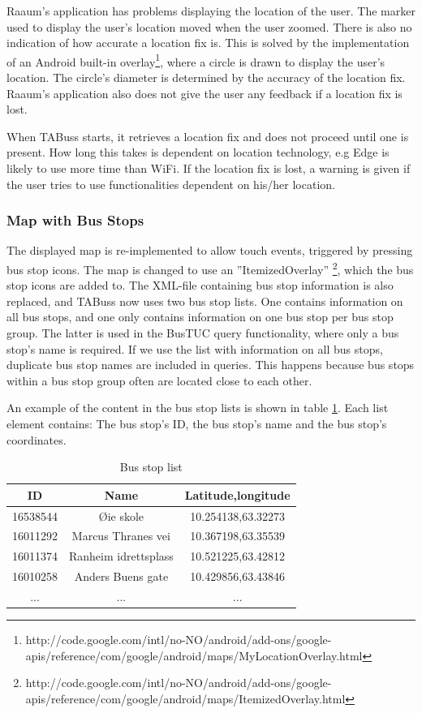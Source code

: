 Raaum's application has problems displaying the location of the user. The marker used to display the user's location moved when the user zoomed. There is also no indication of how accurate a location fix is. This is solved by the implementation of an Android built-in overlay\footnote{http://code.google.com/intl/no-NO/android/add-ons/google-apis/reference/com/google/android/maps/MyLocationOverlay.html}, where a circle is drawn to display the user's location. The circle's diameter is determined by the accuracy of the location fix. Raaum's application also does not give the user any feedback if a location fix is lost. 

When TABuss starts, it retrieves a location fix and does not proceed until one is present. How long this takes is dependent on location technology, e.g Edge is likely to use more time than WiFi. If the location fix is lost, a warning is given if the user tries to use functionalities dependent on his/her location.

\subsubsection{Map with Bus Stops}
\label{sec:mapsstops}
The displayed map is re-implemented to allow touch events, triggered by pressing bus stop icons. The map is changed to use an ''ItemizedOverlay'' \footnote{http://code.google.com/intl/no-NO/android/add-ons/google-apis/reference/com/google/android/maps/ItemizedOverlay.html}, which the bus stop icons are added to. The XML-file containing bus stop information is also replaced, and TABuss now uses two bus stop lists. One contains information on all bus stops, and one only contains information on one bus stop per bus stop group. The latter is used in the BusTUC query functionality, where only a bus stop's name is required. If we use the list with information on all bus stops, duplicate bus stop names are included in queries. This happens because bus stops within a bus stop group often are located close to each other.

An example of the content in the bus stop lists is shown in table \ref{tab:list}. Each list element contains: The bus stop's ID, the bus stop's name and the bus stop's coordinates.
\begin{table}[h!]
\centering
\caption{Bus stop list}
\label{tab:list}
\begin{tabular}{|c|c|c|}
\hline
 ID & Name & Latitude,longitude \\
\hline
16538544 & \O ie skole &10.254138,63.32273 \\
16011292 & Marcus Thranes vei &10.367198,63.35539 \\
16011374 & Ranheim idrettsplass & 10.521225,63.42812 \\
16010258 & Anders Buens gate &10.429856,63.43846 \\
... & ... & ...\\
\hline 
\end{tabular}
\end{table}

